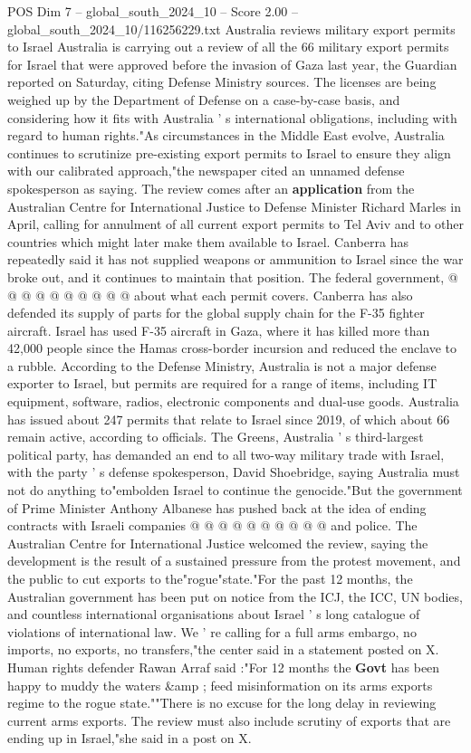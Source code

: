 \begin{textsample}{POS Dim 7 – global\_south\_2024\_10 – Score 2.00 – global\_south\_2024\_10/116256229.txt}  \label{ex:f7_pos_202}
Australia reviews military export permits to Israel Australia is carrying out a review of all the 66 military export permits for Israel that were approved before the invasion of Gaza last year, the Guardian reported on Saturday, citing Defense Ministry sources.
The licenses are being weighed up by the Department of Defense on a case-by-case basis, and considering how it fits with Australia ' s international obligations, including with regard to human rights."As circumstances in the Middle East evolve, Australia continues to scrutinize pre-existing export permits to Israel to ensure they align with our calibrated approach,"the newspaper cited an unnamed defense spokesperson as saying.
The review comes after an \textbf{application} from the Australian Centre for International Justice to Defense Minister Richard Marles in April, calling for annulment of all current export permits to Tel Aviv and to other countries which might later make them available to Israel.
Canberra has repeatedly said it has not supplied weapons or ammunition to Israel since the war broke out, and it continues to maintain that position.
The federal government, @ @ @ @ @ @ @ @ @ @ about what each permit covers.
Canberra has also defended its supply of parts for the global supply chain for the F-35 fighter aircraft.
Israel has used F-35 aircraft in Gaza, where it has killed more than 42,000 people since the Hamas cross-border incursion and reduced the enclave to a rubble.
According to the Defense Ministry, Australia is not a major defense exporter to Israel, but permits are required for a range of items, including IT equipment, software, radios, electronic components and dual-use goods.
Australia has issued about 247 permits that relate to Israel since 2019, of which about 66 remain active, according to officials.
The Greens, Australia ' s third-largest political party, has demanded an end to all two-way military trade with Israel, with the party ' s defense spokesperson, David Shoebridge, saying Australia must not do anything to"embolden Israel to continue the genocide."But the government of Prime Minister Anthony Albanese has pushed back at the idea of ending contracts with Israeli companies @ @ @ @ @ @ @ @ @ @ and police.
The Australian Centre for International Justice welcomed the review, saying the development is the result of a sustained pressure from the protest movement, and the public to cut exports to the"rogue"state."For the past 12 months, the Australian government has been put on notice from the ICJ, the ICC, UN bodies, and countless international organisations about Israel ' s long catalogue of violations of international law.
We ' re calling for a full arms embargo, no imports, no exports, no transfers,"the center said in a statement posted on X.
Human rights defender Rawan Arraf said :"For 12 months the \textbf{Govt} has been happy to muddy the waters \&amp ; feed misinformation on its arms exports regime to the rogue state.""There is no excuse for the long delay in reviewing current arms exports.
The review must also include scrutiny of exports that are ending up in Israel,"she said in a post on X.

\end{textsample}
